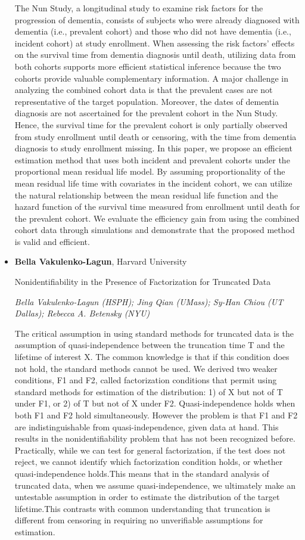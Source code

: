 \begin{itemize}
The Nun Study, a longitudinal study to examine risk factors for the progression of dementia, consists of subjects who were already diagnosed with dementia (i.e., prevalent cohort) and those who did not have dementia (i.e., incident cohort) at study enrollment. When assessing the risk factors' effects on the survival time from dementia diagnosis until death, utilizing data from both cohorts supports more efficient statistical inference because the two cohorts provide valuable complementary information. A major challenge in analyzing the combined cohort data is that the prevalent cases are not representative of the target population. Moreover, the dates of dementia diagnosis are not ascertained for the prevalent cohort in the Nun Study. Hence, the survival time for the prevalent cohort is only partially observed from study enrollment until death or censoring, with the time from dementia diagnosis to study enrollment missing. In this paper, we propose an efficient estimation method that uses both incident and prevalent cohorts under the proportional mean residual life model. By assuming proportionality of the mean residual life time with covariates in the incident cohort, we can utilize the natural relationship between the mean residual life function and the hazard function of the survival time measured from enrollment until death for the prevalent cohort.	We evaluate the efficiency gain from using the combined cohort data through simulations and demonstrate that the proposed method is valid and efficient.

\item \textbf{Bella Vakulenko-Lagun}, Harvard University

Nonidentifiability in the Presence of Factorization for Truncated Data

\emph{\footnotesize Bella Vakulenko-Lagun (HSPH); Jing Qian (UMass); Sy-Han Chiou (UT Dallas); Rebecca A. Betensky (NYU)}

The critical assumption in using standard methods for truncated data is the assumption of quasi-independence between the truncation time T and the lifetime of interest X. The common knowledge is that if this condition does not hold, the standard methods cannot be used. We derived two weaker conditions, F1 and F2, called factorization conditions that permit using standard methods for estimation of the distribution: 1) of X but not of T under F1, or 2) of T but not of X under F2. Quasi-independence holds when both F1 and F2 hold simultaneously. 
However the problem is that F1 and F2 are indistinguishable from quasi-independence, given data at hand. This results in the nonidentifiability problem that has not been recognized before.
Practically, while we can test for general factorization, if the test does not reject, we cannot identify which factorization condition holds, or whether quasi-independence holds.This means that in the standard analysis of truncated data, when we assume quasi-independence, we ultimately make an untestable assumption in order to estimate the distribution of the target lifetime.This contrasts with common understanding that truncation is different from censoring in requiring no unverifiable assumptions for estimation.



\end{itemize}
